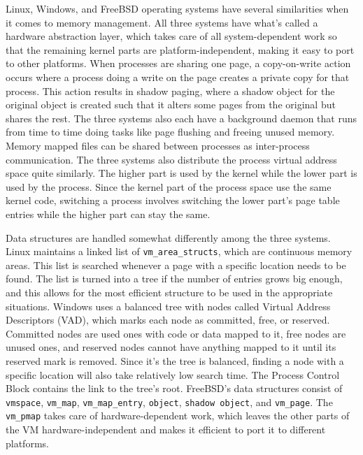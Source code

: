 \documentclass[10pt,draftclsnofoot,onecolumn,letterpaper]{IEEEtran}
\begin{document}
Linux, Windows, and FreeBSD operating systems have several similarities when it comes to memory management. All three systems have what's called a hardware abstraction layer, which takes care of all system-dependent work so that the remaining kernel parts are platform-independent, making it easy to port to other platforms\cite{2}. When processes are sharing one page, a copy-on-write action occurs where a process doing a write on the page creates a private copy for that process. This action results in shadow paging, where a shadow object for the original object is created such that it alters some pages from the original but shares the rest. The three systems also each have a background daemon that runs from time to time doing tasks like page flushing and freeing unused memory. Memory mapped files can be shared between processes as inter-process communication\cite{2}.
The three systems also distribute the process virtual address space quite similarly. The higher part is used by the kernel while the lower part is used by the process. Since the kernel part of the process space use the same kernel code, switching a process involves switching the lower part's page table entries while the higher part can stay the same\cite{2}.

Data structures are handled somewhat differently among the three systems. Linux maintains a linked list of \verb!vm_area_structs!, which are continuous memory areas. This list is searched whenever a page with a specific location needs to be found. The list is turned into a tree if the number of entries grows big enough, and this allows for the most efficient structure to be used in the appropriate situations\cite{2}.
Windows uses a balanced tree with nodes called Virtual Address Descriptors (VAD), which marks each node as committed, free, or reserved. Committed nodes are used ones with code or data mapped to it, free nodes are unused ones, and reserved nodes cannot have anything mapped to it until its reserved mark is removed. Since it's the tree is balanced, finding a node with a specific location will also take relatively low search time. The Process Control Block contains the link to the tree's root\cite{2}.
FreeBSD's data structures consist of \verb!vmspace!, \verb!vm_map!, \verb!vm_map_entry!, \verb!object!, \verb!shadow object!, and \verb!vm_page!. The \verb!vm_pmap! takes care of hardware-dependent work, which leaves the other parts of the VM hardware-independent and makes it efficient to port it to different platforms\cite{2}.
\end{document}
